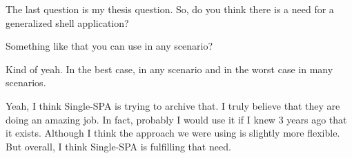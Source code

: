 \begin{description}
    \NicoVogel The last question is my thesis question. So, do you think there is a need for a generalized shell application?

    \LucaMezzalira Something like that you can use in any scenario?

    \NicoVogel Kind of yeah. In the best case, in any scenario and in the worst case in many scenarios.

    \LucaMezzalira Yeah, I think Single-SPA is trying to archive that. I truly believe that they are doing an amazing job. In fact, probably I would use it if I knew 3 years ago that it exists. Although I think the approach we were using is slightly more flexible. But overall, I think Single-SPA is fulfilling that need.



\end{description}
